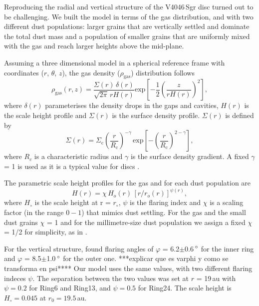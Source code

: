 \documentclass[letters,usenatbib,times]{mnras}
\begin{document}
Reproducing  the  radial and vertical structure of the V4046\,Sgr disc turned out to be challenging.  We  built the model in terms of the gas distribution, and with  two different dust populations: larger grains that are vertically settled and dominate the total dust mass and a  population of smaller grains that are uniformly mixed with the gas and reach larger heights above the mid-plane. 

Assuming a three dimensional model in a spherical reference frame with coordinates ($r$, $\theta$, $z$), the gas density ($\rho_{\mathrm{gas}}$) distribution follows
\begin{equation}
  \rho_{\mathrm{gas}}(r,z) =\frac{\Sigma(r) \,\delta(r)}{\sqrt{2\pi} \,r H(r)}  \mathrm{exp}\left[-\frac{1}{2} \left(\frac{z}{r H(r)}\right)^2\right],
\end{equation}
where $\delta(r)$  parameterises the density drops in the gaps and cavities, $H(r)$ is the scale height profile and $\Sigma(r)$ is the surface density profile. $\Sigma(r)$ is defined by
\begin{equation}
  \Sigma(r) = \Sigma_\mathrm{c} \left(\frac{r}{R_\mathrm{c}}\right)^{-\gamma}  \, \mathrm{exp}\left[-\left(\frac{r}{R_\mathrm{c}}\right)^{2-\gamma}\right],
\end{equation}
where $R_c$ is a characteristic radius and $\gamma$ is the surface density gradient. A fixed $\gamma$ = 1 is used as it is a typical value for discs \citep{Andrews_2009,Andrews_2010}.

The parametric scale height profiles for the gas and for each dust population are 
\begin{equation}
    \label{scale}
  H(r)=\chi \, H_{o}(r) \, [r/r_{o}(r)]^{\psi(r)},
\end{equation}
where $H_\circ$ is the scale height at r = $r_\circ$, $\psi$ is the flaring index and $\chi$ is a scaling factor (in the range $0-1$) that mimics dust settling. For the gas and the small dust grains $\chi$ = 1 and for the millimetre-size dust population we assign a fixed $\chi$ = 1/2 for simplicity, as in \citet{Rosenfeld_2013}.


For the vertical structure, \citet{dOrazi} found flaring angles of $\varphi$ = 6.2$\pm$0.6\,$\hbox{$^\circ$}$ for the inner ring and $\varphi$ = 8.5$\pm$1.0\,$\hbox{$^\circ$}$ for the outer one. ***explicar que es varphi y como se transforma en psi**** Our model uses the same values, with two different flaring indeces $\psi$. The separation between the two values was set at $r$ = 19\,au with $\psi=0.2$ for  Ring6 and Ring13, and $\psi=0.5$ for Ring24. The scale height is  $H_\circ = 0.045$ at $r_0 = 19.5$\,au.
\end{document}
